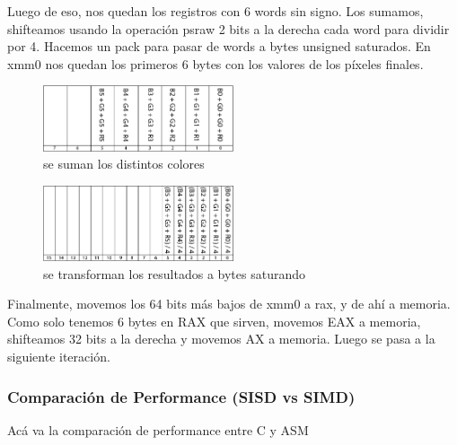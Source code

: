                 Luego de eso, nos quedan los registros con 6 words sin signo. Los sumamos, shifteamos usando la operación psraw 2 bits a la derecha cada word para dividir por 4. Hacemos un pack para pasar de words a bytes unsigned saturados. En xmm0 nos quedan los primeros 6 bytes con los valores de los píxeles finales. \newpage
                
                \begin{figure}[htb]
                \begin{center}
                \leavevmode
                \includegraphics[width=0.5\textwidth]{gris_epsilon_uno_suma.png}
                \end{center}
                \caption{se suman los distintos colores}
                \end{figure}
                
                \begin{figure}[htb]
                \begin{center}
                \leavevmode
                \includegraphics[width=0.5\textwidth]{gris_epsilon_uno_pack.png}
                \end{center}
                \caption{se transforman los resultados a bytes saturando}
                \end{figure}
                
                Finalmente, movemos los 64 bits más bajos de xmm0 a rax, y de ahí a memoria. Como solo tenemos 6 bytes en RAX que sirven, movemos EAX a memoria, shifteamos 32 bits a la derecha y movemos AX a memoria. Luego se pasa a la siguiente iteración.

        \subsubsection{Comparación de Performance (SISD vs SIMD)}

Acá va la comparación de performance entre C y ASM
